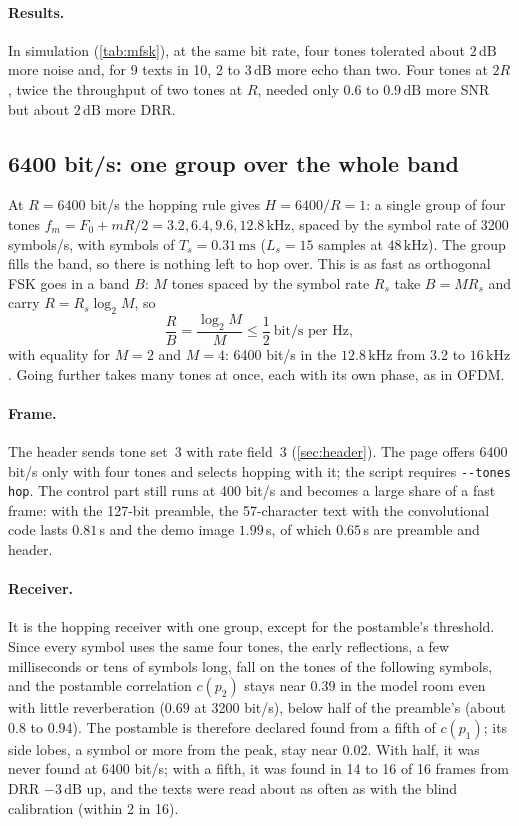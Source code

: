 \documentclass[11pt,a4paper]{article}
\newcommand{\kHz}{\,\mathrm{kHz}}
\newcommand{\ms}{\,\mathrm{ms}}
\newcommand{\dB}{\,\mathrm{dB}}
\newcommand{\code}[1]{\texttt{#1}}
\theoremstyle{remark}
\begin{document}
\paragraph{Results.}
In simulation (\cref{tab:mfsk}), at the same bit rate, four tones tolerated about $2\dB$ more noise and, for 9 texts in 10, 2 to $3\dB$ more echo than two. Four tones at $2R$, twice the throughput of two tones at $R$, needed only $0.6$ to $0.9\dB$ more SNR but about $2\dB$ more DRR.

\subsection{6400 bit/s: one group over the whole band}
\label{sec:wide}
At $R = 6400$ bit/s the hopping rule gives $H = 6400/R = 1$: a single group of four tones $f_m = F_0 + mR/2 = 3.2, 6.4, 9.6, 12.8\kHz$, spaced by the symbol rate of 3200 symbols/s, with symbols of $T_s = 0.31\ms$ ($L_s = 15$ samples at $48\kHz$). The group fills the band, so there is nothing left to hop over. This is as fast as orthogonal FSK goes in a band $B$: $M$ tones spaced by the symbol rate $R_s$ take $B = M R_s$ and carry $R = R_s \log_2 M$, so
\begin{equation}
\frac{R}{B} = \frac{\log_2 M}{M} \le \frac12 \ \text{bit/s per Hz},
\end{equation}
with equality for $M = 2$ and $M = 4$: 6400 bit/s in the $12.8\kHz$ from 3.2 to $16\kHz$. Going further takes many tones at once, each with its own phase, as in OFDM.

\paragraph{Frame.}
The header sends tone set~3 with rate field~3 (\cref{sec:header}). The page offers 6400 bit/s only with four tones and selects hopping with it; the script requires \code{-{}-tones hop}. The control part still runs at 400 bit/s and becomes a large share of a fast frame: with the 127-bit preamble, the 57-character text with the convolutional code lasts $0.81$\,s and the demo image $1.99$\,s, of which $0.65$\,s are preamble and header.

\paragraph{Receiver.}
It is the hopping receiver with one group, except for the postamble's threshold. Since every symbol uses the same four tones, the early reflections, a few milliseconds or tens of symbols long, fall on the tones of the following symbols, and the postamble correlation $c(p_2)$ stays near $0.39$ in the model room even with little reverberation ($0.69$ at 3200 bit/s), below half of the preamble's (about $0.8$ to $0.94$). The postamble is therefore declared found from a fifth of $c(p_1)$; its side lobes, a symbol or more from the peak, stay near $0.02$. With half, it was never found at 6400 bit/s; with a fifth, it was found in 14 to 16 of 16 frames from DRR $-3\dB$ up, and the texts were read about as often as with the blind calibration (within 2 in 16).
\end{document}
